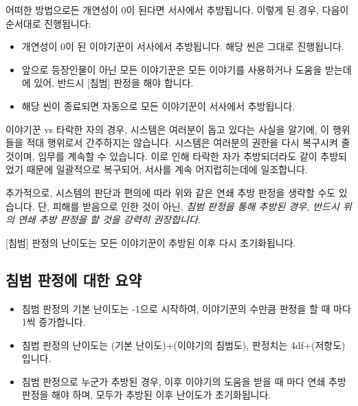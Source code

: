 \documentclass{report}
\begin{document}
	어떠한 방법으로든 개연성이 0이 된다면 서사에서 추방됩니다. 이렇게 된 경우, 다음이 순서대로 진행됩니다:
	\begin{itemize}
		\item 개연성이 0이 된 이야기꾼이 서사에서 추방됩니다. 해당 씬은 그대로 진행됩니다.
		\item 앞으로 등장인물이 아닌 모든 이야기꾼은 모든 이야기를 사용하거나 도움을 받는데에 있어, 반드시 [침범] 판정을 해야 합니다.
		\item 해당 씬이 종료되면 자동으로 모든 이야기꾼이 서사에서 추방됩니다.
	\end{itemize}
	
	이야기꾼 vs 타락한 자의 경우, 시스템은 여러분이 돕고 있다는 사실을 알기에, 이 행위들을 적대 행위로서 간주하지는 않습니다. 시스템은 여러분의 권한을 다시 복구시켜 줄 것이며, 임무를 계속할 수 있습니다. 이로 인해 타락한 자가 추방되더라도 같이 추방되었기 때문에 일괄적으로 복구되어, 서사를 계속 어지럽히는데에 일조합니다.
	
	추가적으로, 시스템의 판단과 편의에 따라 위와 같은 연쇄 추방 판정을 생략할 수도 있습니다. 단, 피해를 받음으로 인한 것이 아닌, \emph{침범 판정을 통해 추방된 경우, 반드시 위의 연쇄 추방 판정을 할 것을 강력히 권장합니다.}
	
	[침범] 판정의 난이도는 모든 이야기꾼이 추방된 이후 다시 초기화됩니다.
	
	\subsection*{침범 판정에 대한 요약}
	\begin{itemize}
		\item 침범 판정의 기본 난이도는 -1으로 시작하여, 이야기꾼의 수만큼 판정을 할 때 마다 1씩 증가합니다.
		\item 침범 판정의 난이도는 (기본 난이도)+(이야기의 침범도), 판정치는 4df+(저항도)입니다.
		\item 침범 판정으로 누군가 추방된 경우, 이후 이야기의 도움을 받을 때 마다 연쇄 추방 판정을 해야 하며, 모두가 추방된 이후 난이도가 초기화됩니다.
	\end{itemize}
	
\end{document}
